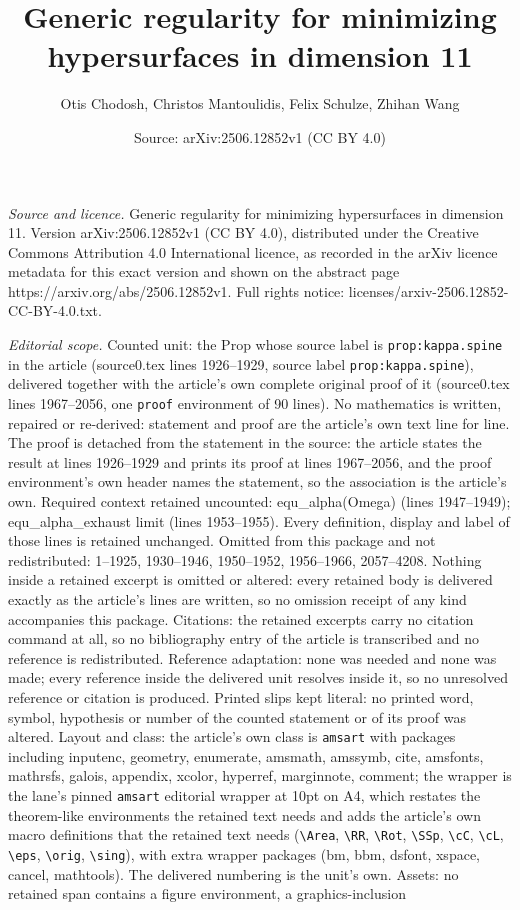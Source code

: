 \documentclass[10pt,a4paper]{amsart}
\title[Generic regularity for minimizing hypersurfaces in dimension]{Generic regularity for minimizing hypersurfaces in dimension 11}
\author{Otis Chodosh, Christos Mantoulidis, Felix Schulze, Zhihan Wang}
\date{Source: arXiv:2506.12852v1 (CC BY 4.0)}
\begin{document}
\maketitle

\noindent\emph{Source and licence.} Generic regularity for minimizing hypersurfaces in dimension 11. Version arXiv:2506.12852v1 (CC BY 4.0), distributed under the Creative Commons Attribution 4.0 International licence, as recorded in the arXiv licence metadata for this exact version and shown on the abstract page https://arxiv.org/abs/2506.12852v1. Full rights notice: licenses/arxiv-2506.12852-CC-BY-4.0.txt.\par\smallskip

\noindent\textit{Editorial scope.} Counted unit: the Prop whose source label is \texttt{prop:kappa.spine} in the article (source0.tex lines 1926--1929, source label \texttt{prop:kappa.spine}), delivered together with the article's own complete original proof of it (source0.tex lines 1967--2056, one \texttt{proof} environment of 90 lines). No mathematics is written, repaired or re-derived: statement and proof are the article's own text line for line. The proof is detached from the statement in the source: the article states the result at lines 1926--1929 and prints its proof at lines 1967--2056, and the proof environment's own header names the statement, so the association is the article's own. Required context retained uncounted: equ\_alpha(Omega) (lines 1947--1949); equ\_alpha\_exhaust limit (lines 1953--1955). Every definition, display and label of those lines is retained unchanged. Omitted from this package and not redistributed: 1--1925, 1930--1946, 1950--1952, 1956--1966, 2057--4208. Nothing inside a retained excerpt is omitted or altered: every retained body is delivered exactly as the article's lines are written, so no omission receipt of any kind accompanies this package. Citations: the retained excerpts carry no citation command at all, so no bibliography entry of the article is transcribed and no reference is redistributed. Reference adaptation: none was needed and none was made; every reference inside the delivered unit resolves inside it, so no unresolved reference or citation is produced. Printed slips kept literal: no printed word, symbol, hypothesis or number of the counted statement or of its proof was altered. Layout and class: the article's own class is \texttt{amsart} with packages including inputenc, geometry, enumerate, amsmath, amssymb, cite, amsfonts, mathrsfs, galois, appendix, xcolor, hyperref, marginnote, comment; the wrapper is the lane's pinned \texttt{amsart} editorial wrapper at 10pt on A4, which restates the theorem-like environments the retained text needs and adds the article's own macro definitions that the retained text needs (\texttt{\textbackslash Area}, \texttt{\textbackslash RR}, \texttt{\textbackslash Rot}, \texttt{\textbackslash SSp}, \texttt{\textbackslash cC}, \texttt{\textbackslash cL}, \texttt{\textbackslash eps}, \texttt{\textbackslash orig}, \texttt{\textbackslash sing}), with extra wrapper packages (bm, bbm, dsfont, xspace, cancel, mathtools). The delivered numbering is the unit's own. Assets: no retained span contains a figure environment, a graphics-inclusion 
\end{document}
